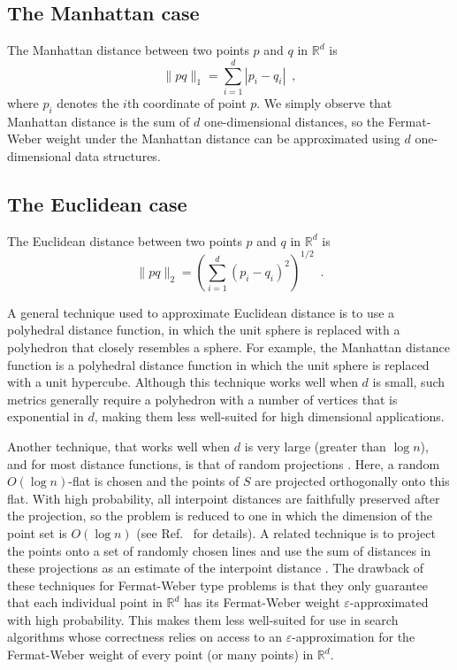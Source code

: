 \documentclass[charterfonts,lotsofwhite]{patmorin}
\newcommand{\eps}{\varepsilon}
\newcommand{\Real}{\mathbb{R}}
\begin{document}
\subsection{The Manhattan case}

The Manhattan distance between two points $p$ and $q$ in $\Real^d$ is
\[
\|pq\|_1 = \sum_{i=1}^d |p_i-q_i| \enspace ,
\]
where $p_i$ denotes the $i$th coordinate of point $p$.  We simply
observe that Manhattan distance is the sum of $d$ one-dimensional
distances, so the Fermat-Weber weight under the Manhattan distance can
be approximated using $d$ one-dimensional data structures.

\subsection{The Euclidean case}

The Euclidean distance between two points $p$ and $q$ in $\Real^d$ is
\[
\|pq\|_2 = \left(\sum_{i=1}^d (p_i-q_i)^2\right)^{1/2} \enspace .
\]

A general technique used to approximate Euclidean distance is to use a
polyhedral distance function, in which the unit sphere is replaced
with a polyhedron that closely resembles a sphere.  For example, the
Manhattan distance function is a polyhedral distance function in which
the unit sphere is replaced with a unit hypercube.  Although this
technique works well when $d$ is small, such metrics generally require
a polyhedron with a number of vertices that is exponential in $d$,
making them less well-suited for high dimensional applications.

Another technique, that works well when $d$ is very large (greater
than $\log n$), and for most distance functions, is that of random
projections \cite{i01}. Here, a random $O(\log n)$-flat is chosen and
the points of $S$ are projected orthogonally onto this flat.  With
high probability, all interpoint distances are faithfully preserved
after the projection, so the problem is reduced to one in which the
dimension of the point set is $O(\log n)$ (see
Ref.~\cite[Lemma~3]{i01} for details).  A related technique is to
project the points onto a set of randomly chosen lines and use the sum
of distances in these projections as an estimate of the interpoint
distance \cite{k97}.  The drawback of these techniques for
Fermat-Weber type problems is that they only guarantee that each
individual point in $\mathbb{R}^d$ has its Fermat-Weber weight
$\eps$-approximated with high probability.  This makes them less
well-suited for use in search algorithms whose correctness relies on
access to an $\eps$-approximation for the Fermat-Weber weight of every
point (or many points) in $\mathbb{R}^d$.
\end{document}
